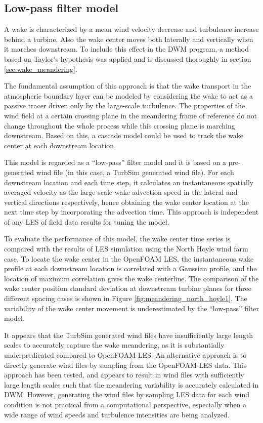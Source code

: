 \documentclass{umthesis}
\begin{document}
\subsection{Low-pass filter model}
A wake is characterized by a mean wind velocity decrease and turbulence increase behind a turbine. Also the wake center moves both laterally and vertically when it marches downstream. To include this effect in the DWM program, a method based on Taylor's hypothesis was applied and is discussed thoroughly in section \ref{sec:wake_meandering}. 

The fundamental assumption of this approach is that the wake transport in the atmospheric boundary layer can be modeled by considering the wake to act as a passive tracer driven only by the large-scale turbulence. The properties of the wind field at a certain crossing plane in the meandering frame of reference do not change throughout the whole process while this crossing plane is marching downstream. Based on this, a cascade model could be used to track the wake center at each downstream location.

This model is regarded as a ``low-pass'' filter model and it is based on a pre-generated wind file (in this case, a TurbSim generated wind file). For each downstream location and each time step, it calculates an instantaneous spatially averaged velocity as the large scale wake advection speed in the lateral and vertical directions respectively, hence obtaining the wake center location at the next time step by incorporating the advection time. This approach is independent of any LES of field data results for tuning the model.

To evaluate the performance of this model, the wake center time series is compared with the results of LES simulation using the North Hoyle wind farm case. To locate the wake center in the OpenFOAM LES, the instantaneous wake profile at each downstream location is correlated with a Gaussian profile, and the location of maximum correlation gives the wake centerline. The comparison of the wake center position standard deviation at downstream turbine planes for three different spacing cases is shown in Figure \ref{fig:meandering_north_hoyle1}. The variability of the wake center movement is underestimated by the ``low-pass'' filter model. 

It appears that the TurbSim generated wind files have insufficiently large length scales to accurately capture the wake meandering, as it is substantially underpredicated compared to OpenFOAM LES. An alternative approach is to directly generate wind files by sampling from the OpenFOAM LES data. This approach has been tested, and appears to result in wind files with sufficiently large length scales such that the meandering variability is accurately calculated in DWM. However, generating the wind files by sampling LES data for each wind condition is not practical from a computational perspective, especially when a wide range of wind speeds and turbulence intensities are being analyzed.  
\end{document}
